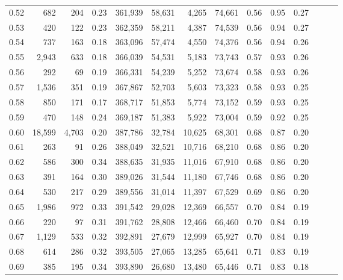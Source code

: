 \begin{tabular}{rrrrrrrrrrrrrr}
0.52 &     682 &     204 &  0.23 &  361,939 &   58,631 &   4,265 &  74,661 &  0.56 &  0.95 &      0.27 \\
0.53 &     420 &     122 &  0.23 &  362,359 &   58,211 &   4,387 &  74,539 &  0.56 &  0.94 &      0.27 \\
0.54 &     737 &     163 &  0.18 &  363,096 &   57,474 &   4,550 &  74,376 &  0.56 &  0.94 &      0.26 \\
0.55 &   2,943 &     633 &  0.18 &  366,039 &   54,531 &   5,183 &  73,743 &  0.57 &  0.93 &      0.26 \\
0.56 &     292 &      69 &  0.19 &  366,331 &   54,239 &   5,252 &  73,674 &  0.58 &  0.93 &      0.26 \\
0.57 &   1,536 &     351 &  0.19 &  367,867 &   52,703 &   5,603 &  73,323 &  0.58 &  0.93 &      0.25 \\
0.58 &     850 &     171 &  0.17 &  368,717 &   51,853 &   5,774 &  73,152 &  0.59 &  0.93 &      0.25 \\
0.59 &     470 &     148 &  0.24 &  369,187 &   51,383 &   5,922 &  73,004 &  0.59 &  0.92 &      0.25 \\
0.60 &  18,599 &   4,703 &  0.20 &  387,786 &   32,784 &  10,625 &  68,301 &  0.68 &  0.87 &      0.20 \\
0.61 &     263 &      91 &  0.26 &  388,049 &   32,521 &  10,716 &  68,210 &  0.68 &  0.86 &      0.20 \\
0.62 &     586 &     300 &  0.34 &  388,635 &   31,935 &  11,016 &  67,910 &  0.68 &  0.86 &      0.20 \\
0.63 &     391 &     164 &  0.30 &  389,026 &   31,544 &  11,180 &  67,746 &  0.68 &  0.86 &      0.20 \\
0.64 &     530 &     217 &  0.29 &  389,556 &   31,014 &  11,397 &  67,529 &  0.69 &  0.86 &      0.20 \\
0.65 &   1,986 &     972 &  0.33 &  391,542 &   29,028 &  12,369 &  66,557 &  0.70 &  0.84 &      0.19 \\
0.66 &     220 &      97 &  0.31 &  391,762 &   28,808 &  12,466 &  66,460 &  0.70 &  0.84 &      0.19 \\
0.67 &   1,129 &     533 &  0.32 &  392,891 &   27,679 &  12,999 &  65,927 &  0.70 &  0.84 &      0.19 \\
0.68 &     614 &     286 &  0.32 &  393,505 &   27,065 &  13,285 &  65,641 &  0.71 &  0.83 &      0.19 \\
0.69 &     385 &     195 &  0.34 &  393,890 &   26,680 &  13,480 &  65,446 &  0.71 &  0.83 &      0.18 \\

\end{tabular}
